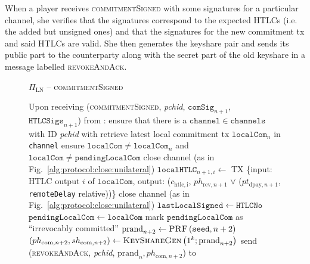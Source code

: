   When a player receives \textsc{commitmentSigned} with some signatures for a
  particular channel, she verifies that the signatures correspond to the
  expected HTLCs (i.e. the added but unsigned ones) and that the signatures for
  the new commitment tx and said HTLCs are valid. She then generates the
  keyshare pair and sends its public part to the counterparty along with the
  secret part of the old keyshare in a message labelled \textsc{revokeAndAck}.

  \begin{figure}[H]
    \begin{protocolbox}{$\Pi_{\mathrm{LN}}$ -- \textsc{commitmentSigned}}
      \begin{algorithmic}[1]
        \State Upon receiving (\textsc{commitmentSigned}, \textit{pchid},
        $\mathtt{comSig}_{n+1}$, $\mathtt{HTLCSigs}_{n+1}$) from \bob:
        \Indent
          \State ensure that there is a $\mathtt{channel} \in \mathtt{channels}$
          with ID \textit{pchid} with \bob
          \State retrieve latest local commitment tx $\mathtt{localCom}_n$ in
          \texttt{channel}
          \State ensure $\mathtt{localCom} \neq \mathtt{localCom}_n$ and
          $\mathtt{localCom} \neq \mathtt{pendingLocalCom}$
            \State close channel (as in Fig.~\ref{alg:protocol:close:unilateral})
            \State \Return
          \EndIf
            \State $\mathtt{localHTLC}_{n+1, i} \gets$ TX \{input: HTLC output
            $i$ of $\mathtt{localCom}$, output: ($c_{\mathrm{htlc, i}}$,
            $ph_{\mathrm{rev}, n+1}$ $\vee$ ($pt_{\mathrm{dpay}, n+1}$,
            \texttt{remoteDelay} relative))\}
              \State close channel (as in
              Fig.~\ref{alg:protocol:close:unilateral})
              \State \Return
            \EndIf
          \EndFor
          \State $\mathtt{lastLocalSigned} \gets \mathtt{HTLCNo}$
          \State $\mathtt{pendingLocalCom} \gets \mathtt{localCom}$
          \State mark $\mathtt{pendingLocalCom}$ as ``irrevocably committed''
          \State $\mathrm{prand}_{n+2} \gets \textsc{PRF}\left(\mathtt{seed},
          n+2\right)$
          \label{alg:protocol:pay:commitmentSigned:prf}
          \State $\left(ph_{\mathrm{com}, n+2}, sh_{\mathrm{com}, n+2}\right)
          \gets \textsc{KeyShareGen}\left(1^k; \mathrm{prand}_{n+2}\right)$
          \State send (\textsc{revokeAndAck}, \textit{pchid}, $\mathrm{prand}_n,
          ph_{\mathrm{com}, n+2}$) to \bob
        \EndIndent
      \end{algorithmic}
    \end{protocolbox}
    \caption{}
    \label{alg:protocol:pay:commitmentSigned}
  \end{figure}

